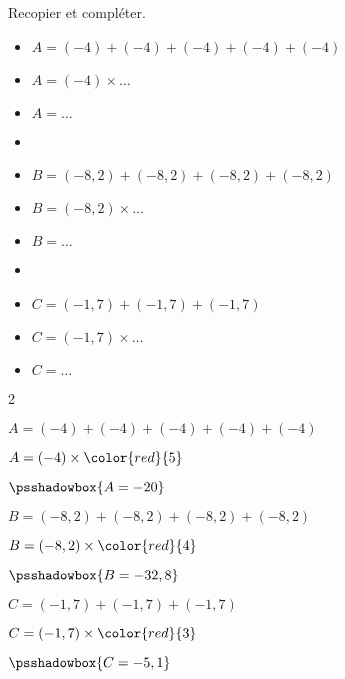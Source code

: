 \begin{exercice*}
    Recopier et compléter.
    \begin{itemize}
        \item[] $A = (-4)+(-4)+(-4)+(-4)+(-4) $
        \item[] $A = (-4)\times \ldots $
        \item[] $A = \ldots $
        \item[] 
        \item[] $B = (-8,2)+(-8,2)+(-8,2)+(-8,2) $
        \item[] $B = (-8,2)\times \ldots $
        \item[] $B = \ldots $
        \item[] 
        \item[] $C = (-1,7)+(-1,7)+(-1,7) $
        \item[] $C = (-1,7)\times \ldots $
        \item[] $C = \ldots $
    \end{itemize}

\end{exercice*}
\begin{corrige}
    \phantom{rrr}
    \begin{multicols}2
    \begin{list}{}
        \item $A = (-4)+(-4)+(-4)+(-4)+(-4) $
        \item $A = (-4)\times \color{red}{5} $
        \item $\psshadowbox{A = -20}$        
        \item $B = (-8,2)+(-8,2)+(-8,2)+(-8,2) $
        \item $B = (-8,2)\times \color{red}{4} $
        \item $\psshadowbox{B = -32,8}$
        \columnbreak 
        \item $C = (-1,7)+(-1,7)+(-1,7) $
        \item $C = (-1,7)\times \color{red}{3} $
        \item $\psshadowbox{C = -5,1}$
    \end{list}
\end{multicols}
\end{corrige}

